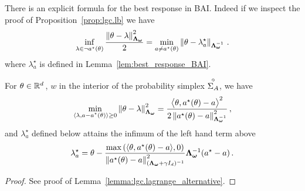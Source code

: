 

There is an explicit formula for the best response in BAI. Indeed if we inspect the proof of Proposition~\ref{prop:lgc.lb} we have
\[
\inf_{\lambda\in \neg a^\star(\theta)} \frac{\left\lVert\theta - \lambda\right\rVert_{{\boldsymbol \Lambda}_{{\boldsymbol \omega}}}^2}{2} = \min_{a \neq a^\star(\theta)} \left\lVert\theta-\lambda^\star_a\right\rVert_{{\boldsymbol \Lambda}_{{\boldsymbol \omega}}^{-1}}\,.
\]
where $\lambda^\star_a$ is defined in Lemma~\ref{lem:best_response_BAI}.

\begin{lemma}
\label{lem:best_response_BAI}
For $\theta \in\mathbb{R}^d\,$, $w$ in the interior of the probability simplex $\overset{\circ}{\Sigma_A}$, we have
\[
\min_{\substack{\langle \lambda,a-a^\star(\theta)\rangle\geq 0}} \left\lVert\theta -\lambda \right\rVert_{{\boldsymbol \Lambda}_{{\boldsymbol \omega}}}^2 = \frac{\big\langle \theta, a^\star(\theta)-a\big\rangle^2}{2 \left\lVert a^\star(\theta)-a\right\rVert_{{\boldsymbol \Lambda}_{{\boldsymbol \omega}}^{-1}}^2}\,,
\]
and $\lambda^\star_a$ defined below attains the infimum of the left hand term above
\[
\lambda^\star_a = \theta - \frac{\max\left(\langle \theta, a^\star(\theta)-a\rangle,0\right)}{\left\lVert a^\star(\theta)-a\right\rVert^2_{({\boldsymbol \Lambda}_{{\boldsymbol \omega}}+\gamma I_d)^{-1}}} {\boldsymbol \Lambda}_{{\boldsymbol \omega}}^{-1}(a^\star - a)\,.
\]
\end{lemma}
\begin{proof}
See proof of Lemma~\ref{lemma:lgc.lagrange_alternative}.
\end{proof}

